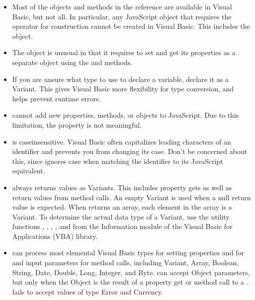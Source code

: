 \documentclass[letterpaper,12pt,english,openany,oneside]{sphinxmanual}
\begin{document}
\begin{itemize}
\item {} 
Most of the objects and methods in the reference are available in Visual Basic, but not all. In particular, any JavaScript object that requires the  operator for construction cannot be created in Visual Basic. This includes the  object.

\item {} 
The  object is unusual in that it requires  to set and get its properties as a separate object using the  and  methods.

\item {} 
If you are unsure what type to use to declare a variable, declare it as a Variant. This gives Visual Basic more flexibility for type conversion, and helps prevent runtime errors.

\item {} 
 cannot add new properties, methods, or objects to JavaScript. Due to this limitation, the  property is not meaningful.

\item {} 
 is case\sphinxhyphen{}insensitive. Visual Basic often capitalizes leading characters of an identifier and prevents you from changing its case. Don’t be concerned about this, since  ignores case when matching the identifier to its JavaScript equivalent.

\item {} 
 always returns values as Variants. This includes property gets as well as return values from method calls. An empty Variant is used when a null return value is expected. When  returns an array, each element in the array is a Variant. To determine the actual data type of a Variant, use the utility functions , , , , and  from the Information module of the Visual Basic for Applications (VBA) library.

\item {} 
 can process most elemental Visual Basic types for setting properties and for and input parameters for method calls, including Variant, Array, Boolean, String, Date, Double, Long, Integer, and Byte.  can accept Object parameters, but only when the Object is the result of a property get or method call to a .  fails to accept values of type Error and Currency.

\end{itemize}
\end{document}
